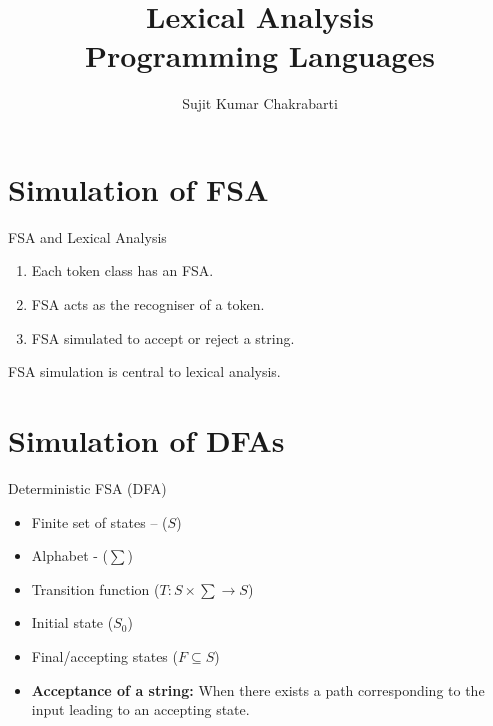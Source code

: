 \documentclass{beamer}
\title[Sujit]{Lexical Analysis \\
Programming Languages}
\author{Sujit Kumar Chakrabarti}
\institute{IIITB}
\date{}
\begin{document}
\maketitle

\section{Simulation of FSA}
\begin{frame}{FSA and Lexical Analysis}
\begin{enumerate}
	\item Each token class has an FSA.
	\item FSA acts as the recogniser of a token.
	\item FSA simulated to accept or reject a string.
\end{enumerate}

\pause
FSA simulation is central to lexical analysis.
\end{frame}




\section{Simulation of DFAs}


\begin{frame}{Deterministic FSA (DFA)}
\begin{itemize}
	\item Finite set of states -- ($S$)
	\item Alphabet - ($\sum$)
	\item Transition function ($T : S \times \sum \rightarrow S$)
	\item Initial state ($S_0$)
	\item Final/accepting states ($F \subseteq S$)
	\item \textbf{Acceptance of a string: }When there exists a path corresponding to the input leading to an accepting state.
\end{itemize}

\end{frame}
\end{document}
